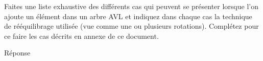 Faites une liste exhaustive des différents cas qui peuvent se présenter lorsque l’on
ajoute un élément dans un arbre AVL et indiquez dans chaque cas la technique de
rééquilibrage utilisée (vue comme une ou plusieurs rotations). Complétez pour ce
faire les cas décrits en annexe de ce document.

Réponse